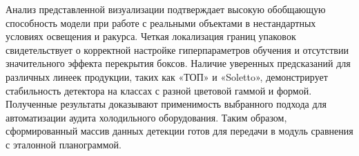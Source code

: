   \par \redline Анализ представленной визуализации подтверждает высокую обобщающую способность модели при работе с реальными объектами в нестандартных условиях освещения и ракурса. Четкая локализация границ упаковок свидетельствует о корректной настройке гиперпараметров обучения и отсутствии значительного эффекта перекрытия боксов. Наличие уверенных предсказаний для различных линеек продукции, таких как «ТОП» и «Soletto», демонстрирует стабильность детектора на классах с разной цветовой гаммой и формой. Полученные результаты доказывают применимость выбранного подхода для автоматизации аудита холодильного оборудования. Таким образом, сформированный массив данных детекции готов для передачи в модуль сравнения с эталонной планограммой.

\setcounter{subchaptercntr}{1}
\setcounter{formulacntr}{1}
\setcounter{imagecntr}{1}